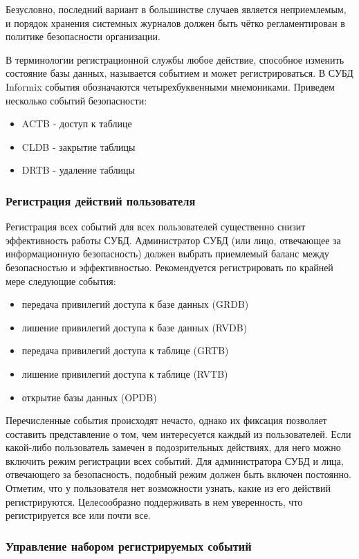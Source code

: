 Безусловно, последний вариант в большинстве случаев является неприемлемым, и порядок хранения системных журналов должен быть чётко регламентирован в политике безопасности организации.

В терминологии регистрационной службы любое действие, способное изменить состояние базы данных, называется событием и может регистрироваться. В СУБД Informix события обозначаются четырехбуквенными мнемониками. Приведем несколько событий безопасности:
\begin{itemize}
    \item ACTB - доступ к таблице
    \item CLDB - закрытие таблицы
    \item DRTB - удаление таблицы
\end{itemize}


\subsubsection{Регистрация действий пользователя}
Регистрация всех событий для всех пользователей существенно снизит эффективность работы СУБД. Администратор СУБД (или лицо, отвечающее за информационную безопасность) должен выбрать приемлемый баланс между безопасностью и эффективностью.
Рекомендуется регистрировать по крайней мере следующие события:
\begin{itemize}
    \item передача привилегий доступа к базе данных (GRDB)
    \item лишение привилегий доступа к базе данных (RVDB)
    \item передача привилегий доступа к таблице (GRTB)
    \item лишение привилегий доступа к таблице (RVTB)
    \item открытие базы данных (OPDB)
\end{itemize}

Перечисленные события происходят нечасто, однако их фиксация позволяет составить представление о том, чем интересуется каждый из пользователей. Если какой-либо пользователь замечен в подозрительных действиях, для него можно включить режим регистрации всех событий. Для администратора СУБД и лица, отвечающего за безопасность, подобный режим должен быть включен постоянно.
Отметим, что у пользователя нет возможности узнать, какие из его действий регистрируются. Целесообразно поддерживать в нем уверенность, что регистрируется все или почти все.

\subsubsection{Управление набором регистрируемых событий}

